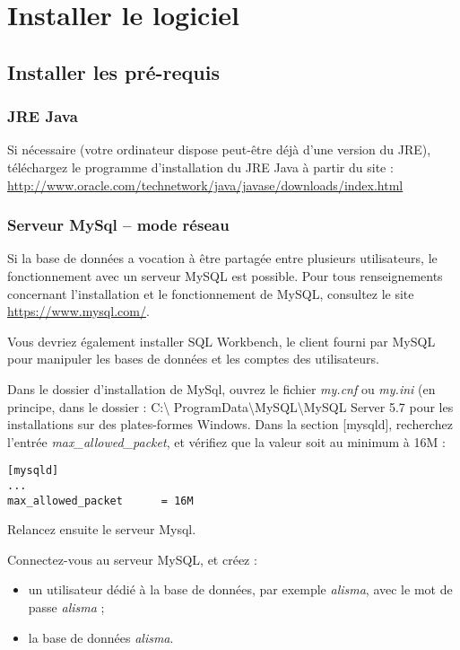 \chapter{Installer le logiciel}

\section{Installer les pré-requis}
\subsection{JRE Java}
Si nécessaire (votre ordinateur dispose peut-être déjà d'une version du JRE), téléchargez le programme d'installation du JRE Java à partir du site : \url{http://www.oracle.com/technetwork/java/javase/downloads/index.html}

\subsection{Serveur MySql -- mode réseau}

Si la base de données a vocation à être partagée entre plusieurs utilisateurs, le fonctionnement avec un serveur MySQL est possible. Pour tous renseignements concernant l'installation et le fonctionnement de MySQL, consultez le site \url{https://www.mysql.com/}.

Vous devriez également installer SQL Workbench, le client fourni par MySQL pour manipuler les bases de données et les comptes des utilisateurs.

Dans le dossier d'installation de MySql, ouvrez le fichier \textit{my.cnf} ou \textit{my.ini} (en principe, dans le dossier : C:\textbackslash{} ProgramData\textbackslash{}MySQL\textbackslash{}MySQL Server 5.7 pour les installations sur des plates-formes Windows. Dans la section [mysqld], recherchez l'entrée \textit{max\_allowed\_packet}, et vérifiez que la valeur soit au minimum à 16M :
\begin{lstlisting}
[mysqld]
...
max_allowed_packet      = 16M
\end{lstlisting}


Relancez ensuite le serveur Mysql.

Connectez-vous au serveur MySQL, et créez :
\begin{itemize}
\item un utilisateur dédié à la base de données, par exemple \textit{alisma}, avec le mot de passe \textit{alisma} ;
\item la base de données \textit{alisma}.
\end{itemize}

